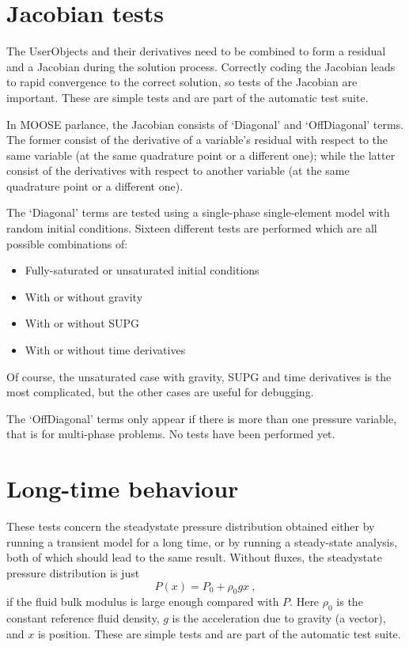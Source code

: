 \documentclass[]{scrreprt}
\begin{document}
\chapter{Jacobian tests}

The UserObjects and their derivatives need to be combined to form a
residual and a Jacobian during the solution process.  Correctly coding
the Jacobian leads to rapid convergence to the correct solution, so
tests of the Jacobian are important.  These are simple tests and are
part of the automatic test suite.

In MOOSE parlance, the Jacobian consists of `Diagonal' and
`OffDiagonal' terms.  The former consist of the derivative of a
variable's residual with respect to the same variable (at the same
quadrature point or a different one); while the latter
consist of the derivatives with respect to another variable (at the
same quadrature point or a different one).

The `Diagonal' terms are tested using a single-phase single-element
model with random initial conditions.  Sixteen different tests are
performed which are all possible combinations of:
\begin{itemize}
\item Fully-saturated or unsaturated initial conditions
\item With or without gravity
\item With or without SUPG
\item With or without time derivatives
\end{itemize}
Of course, the unsaturated case with gravity, SUPG and time
derivatives is the most complicated, but the other cases are useful
for debugging.

The `OffDiagonal' terms only appear if there is more than one pressure
variable, that is for multi-phase problems.  No tests have been
performed yet.



\chapter{Long-time behaviour}

These tests concern the steadystate pressure distribution obtained
either by running a transient model for a long time, or by running a
steady-state analysis, both of which should lead to the same result.
Without fluxes, the steadystate pressure distribution is just
\begin{equation}
P(x) = P_{0} + \rho_{0} g x \ ,
\end{equation}
if the fluid bulk modulus is large enough compared with $P$.  Here
$\rho_{0}$ is the constant reference fluid density, $g$ is the
acceleration due to gravity (a vector), and $x$ is position.  These
are simple tests and are part of the automatic test suite.
\end{document}
